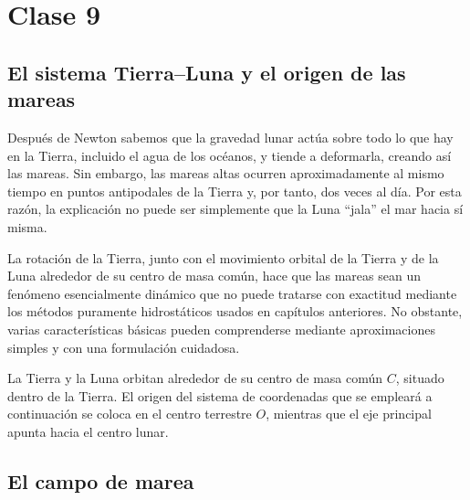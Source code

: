 \shorthandoff{<>}













\shorthandon{<>}

\chapter{Clase 9}

\section{El sistema Tierra--Luna y el origen de las mareas}

Después de Newton sabemos que la gravedad lunar actúa sobre todo lo que hay en la Tierra, incluido el agua de los océanos, y tiende a deformarla, creando así las mareas. Sin embargo, las mareas altas ocurren aproximadamente al mismo tiempo en puntos antipodales de la Tierra y, por tanto, dos veces al día. Por esta razón, la explicación no puede ser simplemente que la Luna “jala” el mar hacia sí misma.

La rotación de la Tierra, junto con el movimiento orbital de la Tierra y de la Luna alrededor de su centro de masa común, hace que las mareas sean un fenómeno esencialmente dinámico que no puede tratarse con exactitud mediante los métodos puramente hidrostáticos usados en capítulos anteriores. No obstante, varias características básicas pueden comprenderse mediante aproximaciones simples y con una formulación cuidadosa.

La Tierra y la Luna orbitan alrededor de su centro de masa común $C$, situado dentro de la Tierra. El origen del sistema de coordenadas que se empleará a continuación se coloca en el centro terrestre $O$, mientras que el eje principal apunta hacia el centro lunar.

\figuraGeometriaTierraLuna

\section{El campo de marea}

